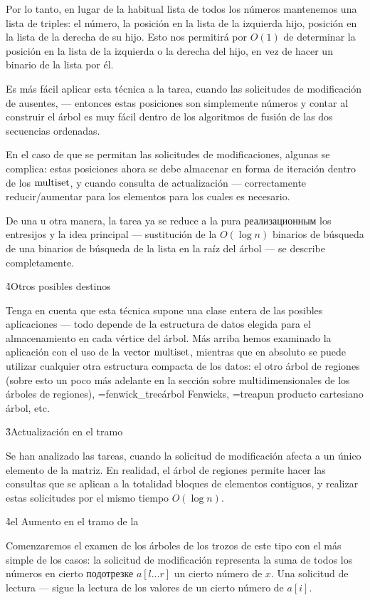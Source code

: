 Por lo tanto, en lugar de la habitual lista de todos los números mantenemos una lista de triples: el número, la posición en la lista de la izquierda hijo, posición en la lista de la derecha de su hijo. Esto nos permitirá por $O (1)$ de determinar la posición en la lista de la izquierda o la derecha del hijo, en vez de hacer un binario de la lista por él.

Es más fácil aplicar esta técnica a la tarea, cuando las solicitudes de modificación de ausentes, --- entonces estas posiciones son simplemente números y contar al construir el árbol es muy fácil dentro de los algoritmos de fusión de las dos secuencias ordenadas.

En el caso de que se permitan las solicitudes de modificaciones, algunas se complica: estas posiciones ahora se debe almacenar en forma de iteración dentro de los $\rm multiset$, y cuando consulta de actualización --- correctamente reducir/aumentar para los elementos para los cuales es necesario.

De una u otra manera, la tarea ya se reduce a la pura реализационным los entresijos y la idea principal --- sustitución de la $O (\log n)$ binarios de búsqueda de una binarios de búsqueda de la lista en la raíz del árbol --- se describe completamente.

\h4{Otros posibles destinos}

Tenga en cuenta que esta técnica supone una clase entera de las posibles aplicaciones --- todo depende de la estructura de datos elegida para el almacenamiento en cada vértice del árbol. Más arriba hemos examinado la aplicación con el uso de la $\rm vector$ $\rm multiset$, mientras que en absoluto se puede utilizar cualquier otra estructura compacta de los datos: el otro árbol de regiones (sobre esto un poco más adelante en la sección sobre multidimensionales de los árboles de regiones), \algohref=fenwick_tree{árbol Fenwicks}, \algohref=treap{un producto cartesiano árbol}, etc.


\h3{Actualización en el tramo}

Se han analizado las tareas, cuando la solicitud de modificación afecta a un único elemento de la matriz. En realidad, el árbol de regiones permite hacer las consultas que se aplican a la totalidad bloques de elementos contiguos, y realizar estas solicitudes por el mismo tiempo $O (\log n)$.

\h4{el Aumento en el tramo de la}

Comenzaremos el examen de los árboles de los trozos de este tipo con el más simple de los casos: la solicitud de modificación representa la suma de todos los números en cierto подотрезке $a[l \ldots r]$ un cierto número de $x$. Una solicitud de lectura --- sigue la lectura de los valores de un cierto número de $a[i]$.

